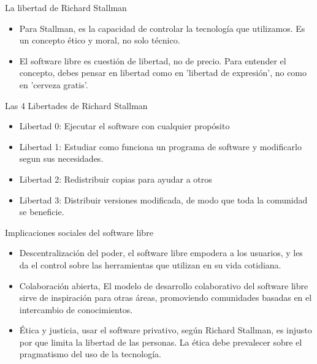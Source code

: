 \documentclass{beamer}
\begin{document}
\begin{frame}{La libertad de Richard Stallman}
  \begin{itemize}
    \item Para Stallman, es la capacidad de controlar la tecnología que utilizamos. Es un concepto ético y moral, no solo técnico. \pause
  \item El software libre es cuestión de libertad, no de precio. Para entender
    el concepto, debes pensar en libertad como en 'libertad de expresión', no
    como en 'cerveza gratis'.
  \end{itemize}
\end{frame}

\begin{frame}{Las 4 Libertades de Richard Stallman}
  \begin{itemize}
    \item Libertad 0: Ejecutar el software con cualquier propósito \pause
    \item Libertad 1: Estudiar como funciona un programa de software y
      modificarlo segun sus necesidades. \pause
    \item Libertad 2: Redistribuir copias para ayudar a otros \pause
    \item Libertad 3: Distribuir versiones modificada, de modo que toda la
      comunidad se beneficie.
  \end{itemize}
\end{frame}

\begin{frame}{Implicaciones sociales del software libre}
\begin{itemize}
  \item Descentralización del poder, el software libre empodera a los usuarios,
    y les da el control sobre las herramientas que utilizan en su vida
    cotidiana. \pause
  \item Colaboración abierta, El modelo de desarrollo colaborativo del software
    libre sirve de inspiración para otras áreas, promoviendo comunidades basadas
    en el intercambio de conocimientos. \pause
  \item Ética y justicia, usar el software privativo, según Richard Stallman, es
    injusto por que limita la libertad de las personas. La ética debe prevalecer
    sobre el pragmatismo del uso de la tecnología.
\end{itemize}
\end{frame}
\end{document}
